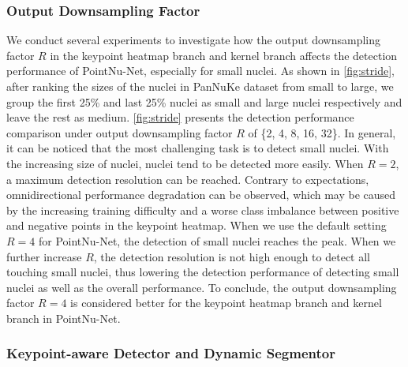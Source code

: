 \documentclass[lettersize,journal]{IEEEtran}
\begin{document}
\subsubsection{Output Downsampling Factor}
We conduct several experiments to investigate how the output downsampling factor $R$ in the keypoint heatmap branch and kernel branch affects the detection performance of PointNu-Net, especially for small nuclei. As shown in \autoref{fig:stride}, after ranking the sizes of the nuclei in PanNuKe dataset from small to large, we group the first 25\% and last 25\% nuclei as small  and large nuclei respectively and leave the rest as medium. \autoref{fig:stride} presents the detection performance comparison under output downsampling factor $R$ of \{2, 4, 8, 16, 32\}. In general, it can be noticed that the most challenging task is to detect small nuclei. With the increasing size of nuclei, nuclei tend to be detected more easily. When $R = 2$, a maximum detection resolution can be reached. Contrary to expectations, omnidirectional performance degradation can be observed, which may be caused by the increasing training difficulty and a worse class imbalance between positive and negative points in the keypoint heatmap. When we use the default setting $R = 4$ for PointNu-Net, the detection of small nuclei reaches the peak. When we further increase $R$, the detection resolution is not high enough to detect all touching small nuclei, thus lowering the detection performance of detecting small nuclei as well as the overall performance. To conclude, the output downsampling factor $R = 4$ is considered better for the keypoint heatmap branch and kernel branch in PointNu-Net.

\subsubsection{Keypoint-aware Detector and Dynamic Segmentor}
\label{sec:abla1}
\end{document}
